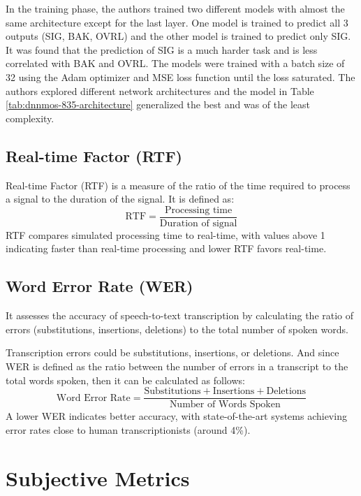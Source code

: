 In the training phase, the authors trained two different models with almost the same architecture except for the last layer. One model is trained to predict all 3 outputs (SIG, BAK, OVRL) and the other model is trained to predict only SIG. It was found that the prediction of SIG is a much harder task and is less correlated with BAK and OVRL. The models were trained with a batch size of 32 using the Adam optimizer \cite{kingma2017adam} and MSE loss function until the loss saturated. The authors explored different network architectures and the model in Table \ref{tab:dnnmos-835-architecture} generalized the best and was of the least complexity.

\subsection{Real-time Factor (RTF)}
Real-time Factor (RTF) is a measure of the ratio of the time required to process a signal to the duration of the signal. It is defined as:
\begin{equation}
    \text{RTF} = \frac{\text{Processing time}}{\text{Duration of signal}}
\end{equation}
RTF compares simulated processing time to real-time, with values above 1 indicating faster than real-time processing and lower RTF favors real-time.

\subsection{Word Error Rate (WER)}
It assesses the accuracy of speech-to-text transcription by calculating the ratio of errors (substitutions, insertions, deletions) to the total number of spoken words.

Transcription errors could be substitutions, insertions, or deletions. And since WER is defined as the ratio between the number of errors in a transcript to the total words spoken, then it can be calculated as follows:
\begin{equation}
    \text{Word Error Rate} = \frac{\text{Substitutions} + \text{Insertions} + \text{Deletions}} {\text{Number of Words Spoken}}
\end{equation}
A lower WER indicates better accuracy, with state-of-the-art systems achieving error rates close to human transcriptionists (around 4\%).


\section{Subjective Metrics}
